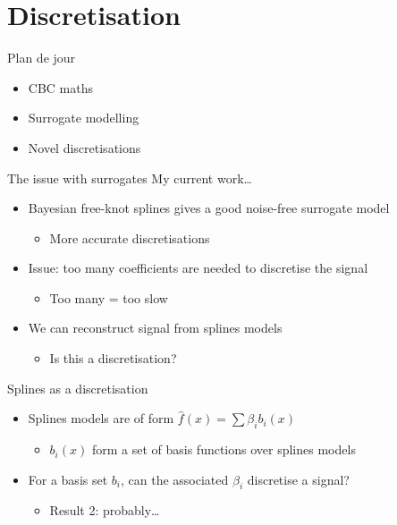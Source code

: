 \documentclass[presentation]{beamer}
\begin{document}
\section{Discretisation}
\label{sec:org1b42638}
\begin{frame}[label={sec:org0683934}]{Plan de jour}
\begin{itemize}
\item CBC maths
\item Surrogate modelling
\item \alert{Novel discretisations}
\end{itemize}
\end{frame}
\begin{frame}[<+->][label={sec:org790a665}]{The issue with surrogates}
My current work\ldots{}
\begin{itemize}
\item Bayesian free-knot splines gives a good noise-free surrogate model
\begin{itemize}
\item More accurate discretisations
\end{itemize}
\end{itemize}
\vfill
\begin{itemize}
\item Issue: too many coefficients are needed to discretise the signal
\begin{itemize}
\item Too many = too slow
\end{itemize}
\end{itemize}
\vfill
\begin{itemize}
\item We can reconstruct signal from splines models
\begin{itemize}
\item Is this a discretisation?
\end{itemize}
\end{itemize}
\end{frame}

\begin{frame}[<+->][label={sec:org5e79332}]{Splines as a discretisation}
\begin{itemize}
\item Splines models are of form \(\hat{f}(x) = \sum \beta_i b_i(x)\)
\begin{itemize}
\item \(b_i(x)\) form a set of basis functions over splines models
\end{itemize}
\end{itemize}
\vfill
\begin{itemize}
\item For a basis set \(b_i\), can the associated \(\beta_i\) discretise a signal?
\begin{itemize}
\item Result 2: probably\ldots{}
\end{itemize}
\end{itemize}
\end{frame}
\end{document}
